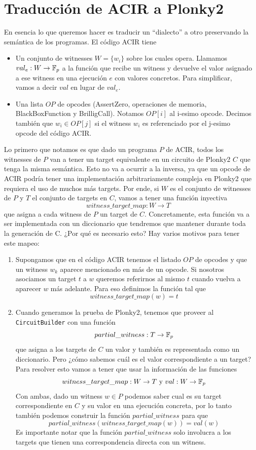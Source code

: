 \section{Traducción de ACIR a Plonky2}
En esencia lo que queremos hacer es traducir un “dialecto'' a otro preservando la semántica de los programas. El código ACIR tiene 
\begin{itemize}
    \item Un conjunto de witnesses $W = \{w_i\}$ sobre los cuales opera. Llamamos $val_e: W \rightarrow \mathbb{F}_p$ a la función que recibe un witness y devuelve el valor asignado a ese witness en una ejecución $e$ con valores concretos. Para simplificar, vamos a decir $val$ en lugar de $val_e$.
    \item Una lista $OP$ de opcodes (AssertZero, operaciones de memoria, BlackBoxFunction y BrilligCall). Notamos $OP[i]$ al i-esimo opcode. Decimos también que $w_i \in OP[j]$ si el witness $w_i$ es referenciado por el j-esimo opcode del código ACIR.
\end{itemize}
Lo primero que notamos es que dado un programa $P$ de ACIR, todos los witnesses de $P$ van a tener un target equivalente en un circuito de Plonky2 $C$ que tenga la misma semántica. Esto no va a ocurrir a la inversa, ya que un opcode de ACIR podría tener una implementación arbitrariamente compleja en Plonky2 que requiera el uso de muchos más targets. Por ende, si $W$ es el conjunto de witnesses de $P$ y $T$ el conjunto de targets en $C$, vamos a tener una función inyectiva 
$$witness\_target\_map: W \rightarrow T$$
que asigna a cada witness de $P$ un target de $C$. Concretamente, esta función va a ser implementada con un diccionario que tendremos que mantener durante toda la generación de C. ¿Por qué es necesario esto? Hay varios motivos para tener este mapeo:
\begin{enumerate}
    \item Supongamos que en el código ACIR tenemos el listado $OP$ de opcodes y que un witness $w_k$ aparece mencionado en más de un opcode. 
    Si nosotros asociamos un target $t$ a $w$ queremos referirnos al mismo $t$ cuando vuelva a aparecer $w$ más adelante. Para eso definimos la función tal que $$witness\_target\_map(w) = t$$ 
    \item Cuando generamos la prueba de Plonky2, tenemos que proveer al \texttt{CircuitBuilder} con una función 
    $$partial\_witness: T \rightarrow \mathbb{F}_p$$ 
    que asigna a los targets de $C$ un valor y también es representada como un diccionario. Pero ¿cómo sabemos cuál es el valor correspondiente a un target? Para resolver esto vamos a tener que usar la información de las funciones 
    $$witness\_target\_map: W \rightarrow T \text{  y  } val: W \rightarrow \mathbb{F}_p$$ 
    Con ambas, dado un witness $w \in P$ podemos saber cual es su target  correspondiente en $C$ y su valor en una ejecución concreta, por lo tanto también podemos construir la función $partial\_witness$ para que 
    $$partial\_witness(witness\_target\_map(w)) = val(w)$$ 
    Es importante notar que la función $partial\_witness$ solo involucra a los targets que tienen una correspondencia directa con un witness.
\end{enumerate}

